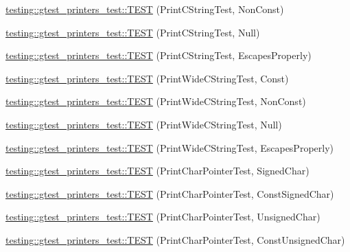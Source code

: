 \begin{DoxyCompactItemize}
\item 
\mbox{\hyperlink{namespacetesting_1_1gtest__printers__test_a89d9905fecee1b976c26d35498734dd4}{testing\+::gtest\+\_\+printers\+\_\+test\+::\+T\+E\+ST}} (Print\+C\+String\+Test, Non\+Const)
\item 
\mbox{\hyperlink{namespacetesting_1_1gtest__printers__test_ad29b97d58a4d1e5e8dd4d854f66b9e22}{testing\+::gtest\+\_\+printers\+\_\+test\+::\+T\+E\+ST}} (Print\+C\+String\+Test, Null)
\item 
\mbox{\hyperlink{namespacetesting_1_1gtest__printers__test_a140030b990011abab91d4c0b59f21edd}{testing\+::gtest\+\_\+printers\+\_\+test\+::\+T\+E\+ST}} (Print\+C\+String\+Test, Escapes\+Properly)
\item 
\mbox{\hyperlink{namespacetesting_1_1gtest__printers__test_a4caa1f81979cdc6f5ada95e01a4fae63}{testing\+::gtest\+\_\+printers\+\_\+test\+::\+T\+E\+ST}} (Print\+Wide\+C\+String\+Test, Const)
\item 
\mbox{\hyperlink{namespacetesting_1_1gtest__printers__test_a8812b5f088e13083ebb8a7e35fbcdae7}{testing\+::gtest\+\_\+printers\+\_\+test\+::\+T\+E\+ST}} (Print\+Wide\+C\+String\+Test, Non\+Const)
\item 
\mbox{\hyperlink{namespacetesting_1_1gtest__printers__test_acd1267d49d61ad53b2b8a88f68fca3a7}{testing\+::gtest\+\_\+printers\+\_\+test\+::\+T\+E\+ST}} (Print\+Wide\+C\+String\+Test, Null)
\item 
\mbox{\hyperlink{namespacetesting_1_1gtest__printers__test_aa80d6bb47e6bf997dacf0c75322d12cf}{testing\+::gtest\+\_\+printers\+\_\+test\+::\+T\+E\+ST}} (Print\+Wide\+C\+String\+Test, Escapes\+Properly)
\item 
\mbox{\hyperlink{namespacetesting_1_1gtest__printers__test_acd7a56709621a91dca669023d192bdc7}{testing\+::gtest\+\_\+printers\+\_\+test\+::\+T\+E\+ST}} (Print\+Char\+Pointer\+Test, Signed\+Char)
\item 
\mbox{\hyperlink{namespacetesting_1_1gtest__printers__test_ae854b0ca4d06ffc273c391f262884681}{testing\+::gtest\+\_\+printers\+\_\+test\+::\+T\+E\+ST}} (Print\+Char\+Pointer\+Test, Const\+Signed\+Char)
\item 
\mbox{\hyperlink{namespacetesting_1_1gtest__printers__test_afb9a6a26323b287b7666b6adb5bdb149}{testing\+::gtest\+\_\+printers\+\_\+test\+::\+T\+E\+ST}} (Print\+Char\+Pointer\+Test, Unsigned\+Char)
\item 
\mbox{\hyperlink{namespacetesting_1_1gtest__printers__test_aa0487f8fd5052f7d6afe2b18ad7931f9}{testing\+::gtest\+\_\+printers\+\_\+test\+::\+T\+E\+ST}} (Print\+Char\+Pointer\+Test, Const\+Unsigned\+Char)

\end{DoxyCompactItemize}
